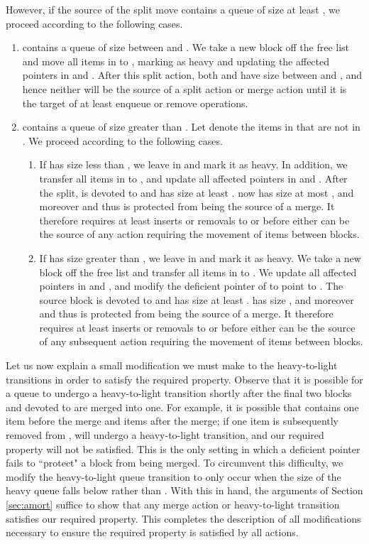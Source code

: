 \documentclass[11pt,letterpaper]{article}
\begin{document}
However, if the source  of the split move contains a queue  of size at least , we proceed according to the following cases.
\begin{enumerate}
\item  contains a queue  of size between  and . We take a new block  off the free list and move all items in 
to , marking  as heavy and updating the affected pointers in  and . After this split action, both  and  have size between  and , and hence neither will be the source of a split action or merge action until it is the target of at least  enqueue or remove operations. 
\item  contains a queue  of size greater than . Let  denote the items in  that are not in . We proceed according to the following cases.
	\begin{enumerate} \item If  has size less than , we leave  in  and mark it as heavy. In addition, we transfer all items in  to , and update all affected pointers in  and . After the split,  is devoted to  and has size at least .  now has size at most , and moreover  and thus  is protected from being the source of a merge. It therefore requires at least  inserts or removals to  or  before either can be the source of any action requiring the movement of items between blocks.
	\item  If  has size greater than , we leave  in  and mark it as heavy. We take a new block  off the free list and transfer all items in  to . We update all affected pointers in  and , and modify the deficient pointer  of  to point to . The source block  is devoted to  and has size at least .  has size , and moreover  and thus  is protected from being the source of a merge. It therefore requires at least  inserts or removals to  or  before either can be the source of any subsequent action requiring the movement of items between blocks.  \end{enumerate}
\end{enumerate}

Let us now explain a small modification we must make to the heavy-to-light transitions in order to satisfy the required property. 
Observe that it is possible for a queue  to undergo a heavy-to-light transition shortly after the final two blocks  and  devoted to  are merged into one. For example, it is possible that  contains one item before the merge and  items after the merge; if one item is subsequently removed from ,  will undergo a heavy-to-light transition, and our required property will not be satisfied. This is the only setting in which a deficient pointer fails to ``protect" a block from being merged. To circumvent this difficulty, we modify the heavy-to-light queue transition to only occur when the size of the heavy queue falls below  rather than . With this in hand, the arguments of Section \ref{sec:amort} suffice to show that any merge action or heavy-to-light transition satisfies our required property. This completes the description of all modifications necessary to ensure the required property is satisfied by all actions.
\end{document}
